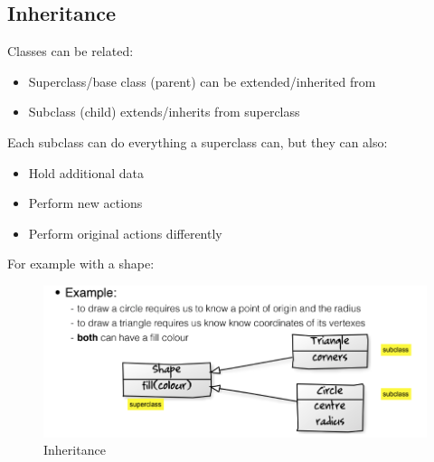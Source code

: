 \documentclass{article}
\begin{document}
\subsection{Inheritance}
Classes can be related: 
\begin{itemize}
    \item Superclass/base class (parent) can be extended/inherited from
    \item Subclass (child) extends/inherits from superclass
\end{itemize}
Each subclass can do everything a superclass can, but they can also:
\begin{itemize}
    \item Hold additional data
    \item Perform new actions
    \item Perform original actions differently
\end{itemize}
For example with a shape:
\begin{figure}[H]
\centering
\includegraphics[width = 0.5\linewidth]{Pictures/Screenshot 2023-01-25 at 13.26.24.png}
\caption{Inheritance}
\end{figure}
\end{document}
